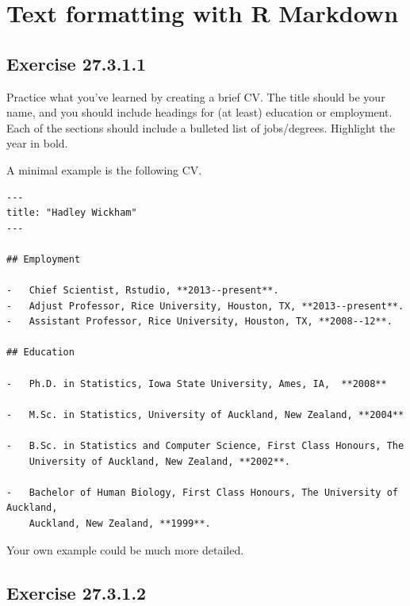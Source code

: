 \documentclass[]{book}
\theoremstyle{plain}
\theoremstyle{remark}
\begin{document}
\hypertarget{text-formatting-with-r-markdown}{%
\section{Text formatting with R Markdown}\label{text-formatting-with-r-markdown}}

\hypertarget{exercise-27.3.1.1}{%
\subsection*{\texorpdfstring{Exercise {27.3.1.1}}{Exercise 27.3.1.1}}\label{exercise-27.3.1.1}}

Practice what you've learned by creating a brief CV. The title should be your name, and you should include headings for (at least) education or employment. Each of the sections should include a bulleted list of jobs/degrees. Highlight the year in bold.

A minimal example is the following CV.

\begin{verbatim}
---
title: "Hadley Wickham"
---

## Employment

-   Chief Scientist, Rstudio, **2013--present**.
-   Adjust Professor, Rice University, Houston, TX, **2013--present**.
-   Assistant Professor, Rice University, Houston, TX, **2008--12**.

## Education

-   Ph.D. in Statistics, Iowa State University, Ames, IA,  **2008**

-   M.Sc. in Statistics, University of Auckland, New Zealand, **2004**

-   B.Sc. in Statistics and Computer Science, First Class Honours, The 
    University of Auckland, New Zealand, **2002**.

-   Bachelor of Human Biology, First Class Honours, The University of Auckland, 
    Auckland, New Zealand, **1999**.
\end{verbatim}

Your own example could be much more detailed.

\hypertarget{exercise-27.3.1.2}{%
\subsection*{\texorpdfstring{Exercise {27.3.1.2}}{Exercise 27.3.1.2}}\label{exercise-27.3.1.2}}
\end{document}
